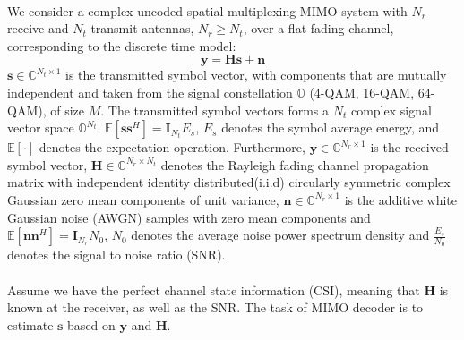 \documentclass[12pt,a4paper,final]{article}
\begin{document}
\begin{spacing}{2.5}
\paragraph{}We consider a complex uncoded spatial multiplexing MIMO system with $N_r$ receive and $N_t$ transmit antennas, $N_{r}\geq N_{t}$, over a flat fading channel, corresponding to the discrete time model:
\begin{equation}
\mathbf{y}=\mathbf{H}\mathbf{s}+\mathbf{n}   \label{formula 1}
\end{equation}
$\mathbf{s}\in \mathbb{C}^{N_{t}\times 1}$ is the transmitted symbol vector, with components that are mutually independent and taken from the signal constellation $\mathbb{O}$ (4-QAM, 16-QAM, 64-QAM), of size $M$. The transmitted symbol vectors forms a $N_{t}$ complex signal vector space $\mathbb{O}^{N_{t}}$. $\mathbb{E}[\mathbf{s}\mathbf{s}^{H}]=\mathbf{I}_{N_t}E_{s}$, $E_{s}$ denotes the symbol average energy, and $\mathbb{E}[\cdot]$ denotes the expectation operation. Furthermore,  $\mathbf{y}\in \mathbb{C}^{N_{r}\times 1}$ is the received symbol vector, $\mathbf{H}\in \mathbb{C}^{N_{r}\times N_{t}}$ denotes the Rayleigh fading channel propagation matrix with independent identity distributed(i.i.d) circularly symmetric complex Gaussian zero mean components of unit variance, $\mathbf{n}\in \mathbb{C}^{N_{r}\times 1}$ is the additive white Gaussian noise (AWGN) samples with zero mean components and $\mathbb{E}[\mathbf{n}\mathbf{n}^{H}]=\mathbf{I}_{N_{r}}N_{0}$, $N_{0}$ denotes the average noise power spectrum density and $\frac{E_{s}}{N_{0}}$ denotes the signal to noise ratio (SNR). \\

\paragraph{} Assume we have the perfect channel state information (CSI), meaning that $ \mathbf{H}$ is known at the receiver, as well as the SNR. The task of MIMO decoder is to estimate $\mathbf{s}$ based on $\mathbf{y}$ and $\mathbf{H}$.


%
%


\end{spacing}
\end{document}
